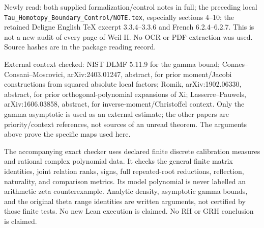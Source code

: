 Newly read: both supplied formalization/control notes in full; the
preceding local \nolinkurl{Tau_Homotopy_Boundary_Control/NOTE.tex},
especially sections 4--10; the retained Deligne English TeX excerpt
3.3.4--3.3.6 and French 6.2.4--6.2.7. This is not a new audit of every
page of Weil II. No OCR or PDF extraction was used. Source hashes are in
the package reading record.

External context checked: NIST DLMF 5.11.9 for the gamma bound;
Connes--Consani--Moscovici, arXiv:2403.01247, abstract, for prior
moment/Jacobi constructions from squared absolute local factors; Romik,
arXiv:1902.06330, abstract, for prior orthogonal-polynomial expansions
of Xi; Lasserre--Pauwels, arXiv:1606.03858, abstract, for
inverse-moment/Christoffel context. Only the gamma asymptotic is used as
an external estimate; the other papers are priority/context references,
not sources of an unread theorem. The arguments above prove the specific
maps used here.

The accompanying exact checker uses declared finite discrete calibration
measures and rational complex polynomial data. It checks the general
finite matrix identities, joint relation ranks, signs, full
repeated-root reductions, reflection, naturality, and comparison
metrics. Its model polynomial is never labelled an arithmetic zeta
counterexample. Analytic density, asymptotic gamma bounds, and the
original theta range identities are written arguments, not certified by
those finite tests. No new Lean execution is claimed. No RH or GRH
conclusion is claimed.

